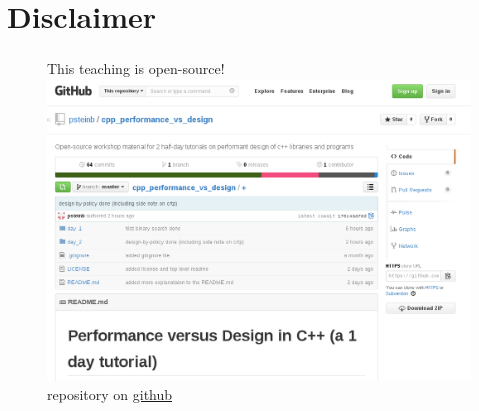 \documentclass[9pt,xcolor=table]{beamer}
\begin{document}
\section*{Disclaimer}
\begin{frame}
\frametitle{\insertsection{}}
\begin{figure}[htb]\Large
  This teaching is open-source!\\
  \includegraphics[width=.7\textwidth]{img/all_on_github}\\[6pt]\small
  repository on \href{https://github.com/psteinb/cpp_performance_vs_design}{github}
\end{figure}
\end{frame}
\end{document}
